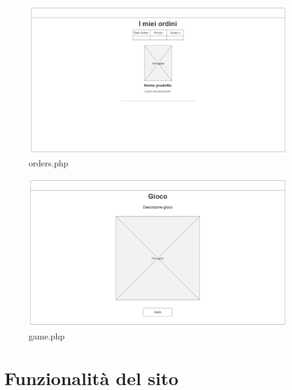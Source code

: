 \documentclass[14pt]{extarticle}
\begin{document}
\begin{figure}
    \includegraphics[width=\linewidth]{mocanu/mockup/Ordini.png}
    \caption{orders.php}
    \label{fig:orders.php}
\end{figure}
\begin{figure}
    \includegraphics[width=\linewidth]{mocanu/mockup/Gioco.png}
    \caption{game.php}
    \label{fig:game.php}
\end{figure}



\section{Funzionalità del sito}
\end{document}
